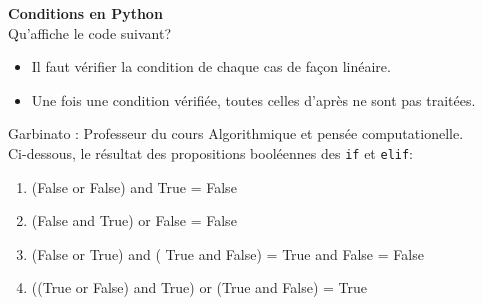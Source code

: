 \begin{Exercice}[5 minutes] \textbf{Conditions en Python}\\
  Qu'affiche le code suivant?
  
   
    \begin{conseil}
      	\begin{itemize}
      		\item Il faut vérifier la condition de chaque cas de façon linéaire.
      		\item Une fois une condition vérifiée, toutes celles d'après ne sont pas traitées.
      	\end{itemize}
        
    \end{conseil}
    \begin{solution}
    
    Garbinato : Professeur du cours Algorithmique et pensée computationelle. \\
    
    Ci-dessous, le résultat des propositions booléennes des \lstinline{if} et \lstinline{elif}: \\
    
    \begin{enumerate}
    	\item (False or False) and True = False
    	\item (False and True) or False = False
    	\item (False or True) and ( True and False) = True and False = False
    	\item ((True or False) and True) or (True and False) = True
    \end{enumerate}
           
    \end{solution}   
\end{Exercice}


\newpage
